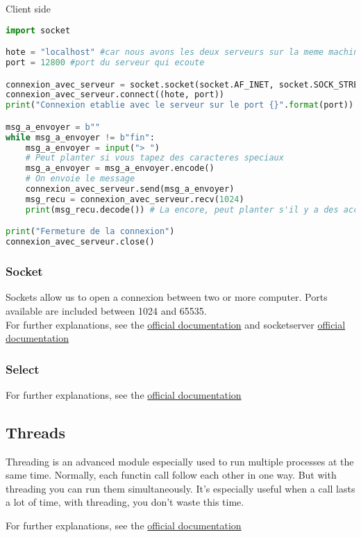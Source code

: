 \documentclass[a4paper, 12pt, titlepage]{scrartcl} %
\begin{document}
Client side \\
\begin{lstlisting}[language=Python]
import socket

hote = "localhost" #car nous avons les deux serveurs sur la meme machine
port = 12800 #port du serveur qui ecoute

connexion_avec_serveur = socket.socket(socket.AF_INET, socket.SOCK_STREAM)
connexion_avec_serveur.connect((hote, port))
print("Connexion etablie avec le serveur sur le port {}".format(port))

msg_a_envoyer = b""
while msg_a_envoyer != b"fin":
    msg_a_envoyer = input("> ")
    # Peut planter si vous tapez des caracteres speciaux
    msg_a_envoyer = msg_a_envoyer.encode()
    # On envoie le message
    connexion_avec_serveur.send(msg_a_envoyer)
    msg_recu = connexion_avec_serveur.recv(1024)
    print(msg_recu.decode()) # La encore, peut planter s'il y a des accents

print("Fermeture de la connexion")
connexion_avec_serveur.close()
\end{lstlisting}

\subsubsection{Socket}
Sockets allow us to open a connexion between two or more computer. Ports available are included between 1024 and 65535. \\
For further explanations, see the \href{https://docs.python.org/3/library/socket.html}{official documentation} and socketserver  \href{https://docs.python.org/3/library/socketserver.html}{official documentation} 
\subsubsection{Select}
For further explanations, see the \href{https://docs.python.org/3/library/select.html}{official documentation}

\subsection{Threads}
Threading is an advanced module especially used to run multiple processes at the same time. Normally, each functin call follow each other in one way. But with threading you can run them simultaneously. It's especially useful when a call lasts a lot of time, with threading, you don't waste this time.

For further explanations, see the \href{https://docs.python.org/3/library/threading.html}{official documentation}
\end{document}
